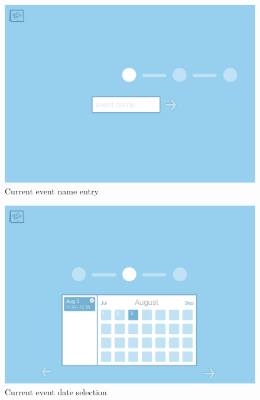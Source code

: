 \documentclass{sigchi}
\begin{document}
\begin{figure}
  \centering
  \includegraphics[width=1.75\columnwidth]{Mockup/EventName}
  \caption{Current event name entry}
\end{figure}

\begin{figure}
  \centering
  \includegraphics[width=1.75\columnwidth]{Mockup/DateSelection}
  \caption{Current event date selection}
\end{figure}
\end{document}
